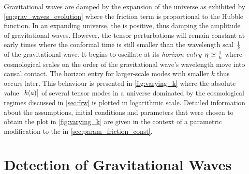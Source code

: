 \documentclass[12pt,parskip=half]{scrreprt}
\begin{document}
 

Gravitational waves are damped by the expansion of the universe as exhibited by \eqref{eq:grav_waves_evolution} where the friction term is proportional to the Hubble function. In an expanding universe, the  is positive, thus damping the amplitude of gravitational waves. However, the tensor perturbations will remain constant at early times where the conformal time is still smaller than the wavelength scal~\(\frac{1}{k}\) of the gravitational wave. It begins to oscillate at its \emph{horizon entry}~\(\eta \simeq \frac{1}{k}\) where cosmological scales on the order of the gravitational wave's wavelength move into causal contact. The horizon entry for larger-scale modes with smaller \(k\) thus occurs later. This behaviour is presented in \autoref{fig:varying_k} where the absolute value~\(\abs{h(a)}\) of several tensor modes in a universe dominated by the cosmological regimes discussed in \autoref{sec:frw} is plotted in logarithmic scale. Detailed information about the assumptions, initial conditions and parameters that were chosen to obtain the plot in \autoref{fig:varying_k} are given in the context of a parametric modification to the  in \autoref{sec:param_friction_const}.


\section{Detection of Gravitational Waves}\label{sec:grav_waves_detection}
\end{document}
